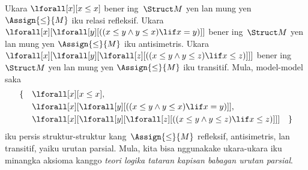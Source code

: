 \documentclass[../../../include/open-logic-section]{subfiles}
\begin{document}
\begin{ex}
Ukara $\lforall[x][x \le x]$ bener ing~$\Struct M$
yen lan mung yen $\Assign{\le}{M}$ iku relasi refleksif.
Ukara
$\lforall[x][\lforall[y][((x \le y \land y \le x) \lif x = y)]]$
bener ing~$\Struct M$ yen lan mung yen $\Assign{\le}{M}$
iku antisimetris. Ukara
$\lforall[x][\lforall[y][\lforall[z][((x \le y \land y \le z)
      \lif x \le z)]]]$ bener ing~$\Struct M$ yen lan
mung yen $\Assign{\le}{M}$ iku transitif. Mula, model-model saka
\begin{align*}
\{\quad &\lforall[x][x \le x], \\
   & \lforall[x][\lforall[y][((x \le y \land y \le
    x) \lif x = y)]], \\
   &\lforall[x][\lforall[y][\lforall[z][((x \le y
      \land y \le z) \lif x \le z)]]] \quad \}
\end{align*}
iku persis struktur-struktur kang~$\Assign{\le}{M}$ refleksif,
antisimetris, lan transitif, yaiku urutan parsial. Mula,
kita bisa nggunakake ukara-ukara iku minangka aksioma
kanggo \emph{teori logika tataran kapisan babagan urutan parsial}.
\end{ex}
\end{document}
